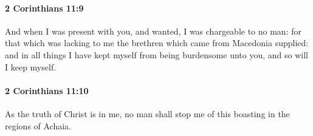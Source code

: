 		\paragraph{2 Corinthians 11:9} %
			\label{2CORINTHIANS-11-9}

			And when I was present with you, and wanted, I was chargeable to no man: for that which was lacking to me the brethren which came from Macedonia supplied: and in all things I have kept myself from being burdensome unto you, and so will I keep myself.

			\begin{framed}
			\scriptsize
				\begin{compactdesc}
					\item[SBLG] 
				\end{compactdesc}
			\end{framed}

		\paragraph{2 Corinthians 11:10} %
			\label{2CORINTHIANS-11-10}

			As the truth of Christ is in me, no man shall stop me of this boasting in the regions of Achaia.

